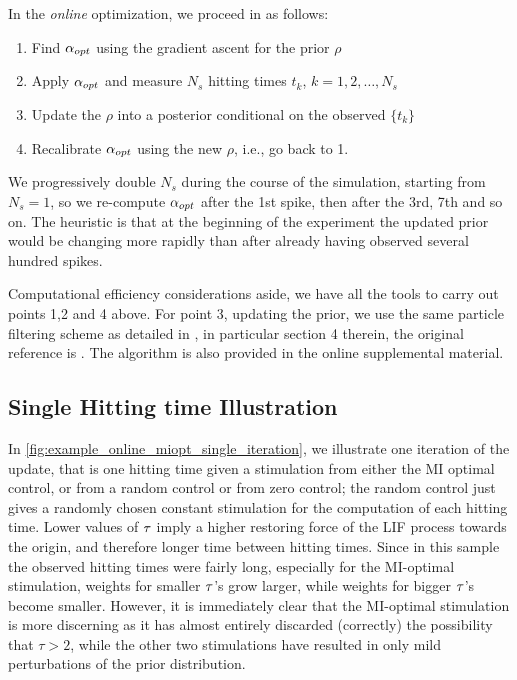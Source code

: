 \documentclass[12pt]{article}
\begin{document}
In the {\sl online} optimization, we proceed in as follows:
\begin{enumerate}
  \item Find ${{\alpha}_{opt} }$ using the gradient ascent for the prior $\rho$
  \item Apply ${{\alpha}_{opt} }$ and measure $N_{s}$ hitting times
  $t_k$, $k=1,2,\ldots,N_{s}$
  \item Update the $\rho$ into a posterior conditional on the observed $\{t_k\}$
  \item Recalibrate ${{\alpha}_{opt} }$ using the new $\rho$, i.e., go back to 1. 
\end{enumerate}

We progressively double $N_s$ during the course of the simulation, starting from
$N_s=1$, so we re-compute ${{\alpha}_{opt} }$ after the 1st spike, then after the 3rd, 7th
and so on. The heuristic is that at the beginning of the experiment the updated
prior would be changing more rapidly than after already having observed
several hundred spikes.

Computational efficiency considerations aside, we have all the tools to carry
out points 1,2 and 4 above. For point 3, updating the prior, we use the same
particle filtering scheme as detailed in \cite{Granade2012}, in particular
section 4 therein, the original reference is \cite{Liu2001}. The algorithm is
also provided in the online supplemental material.

\subsection{Single Hitting time Illustration}
In \cref{fig:example_online_miopt_single_iteration}, we
illustrate one iteration of the update, that is one hitting time given a
stimulation from either the MI optimal control, or from a random
control or from zero control; the random control 
just gives a randomly chosen constant stimulation for the computation
of each hitting time. 
Lower values of ${ \tau }$ imply a higher restoring force of the LIF
process towards the origin, and therefore longer time between hitting times.
Since in this sample the observed hitting times were fairly long, especially for
the MI-optimal stimulation, weights for smaller ${\tau}$'s grow larger, while weights
for bigger ${\tau}$'s become smaller. However, it is immediately clear that the
MI-optimal stimulation is more discerning as it has almost entirely discarded
(correctly) the possibility that $\tau>2$, while the other two stimulations have
resulted in only mild perturbations of the prior distribution.
\end{document}
